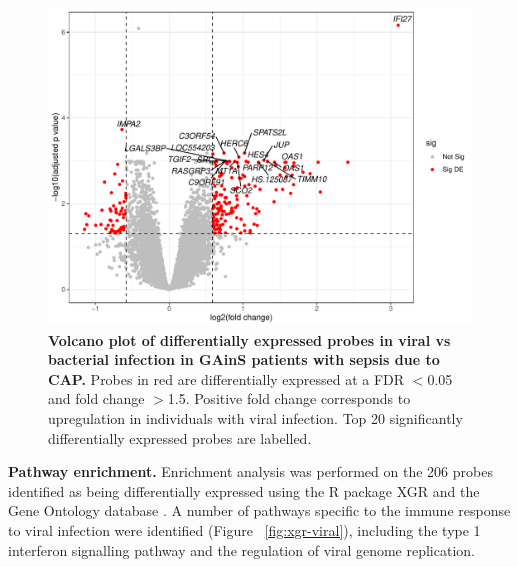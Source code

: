 \FloatBarrier
\begin{figure}[htbp]
\centering
\includegraphics[width=\textwidth]{./Results3/Images/vp-viral-bacterial.pdf}
\caption[Volcano plot of differentially expressed probes in viral infection]{\textbf{Volcano plot of differentially expressed probes in viral vs bacterial infection in GAinS patients with sepsis due to CAP.} Probes in red are differentially expressed at a FDR $<$0.05 and fold change $>$1.5. Positive fold change corresponds to upregulation in individuals with viral infection. Top 20 significantly differentially expressed probes are labelled.}
\label{fig:vp-viral-bacterial}
\end{figure}
\FloatBarrier

\textbf{Pathway enrichment.} Enrichment analysis was performed on the 206 probes identified as being differentially expressed using the R package XGR \parencite{Fang2016} and the Gene Ontology database \parencite{GO2019} \parencite{Ashburner2000}. A number of pathways specific to the immune response to viral infection were identified (Figure ~\ref{fig:xgr-viral}), including the type 1 interferon signalling pathway and the regulation of viral genome replication.

